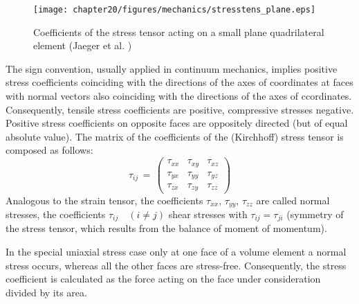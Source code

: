
\begin{figure}[htb!]
\begin{center}
\footnotesize
\texttt{[image: chapter20/figures/mechanics/stresstens\_plane.eps]}
\caption{Coefficients of the stress tensor acting on a small plane quadrilateral element (Jaeger et al. \cite{JCZ:2007})}
\label{fig:stresstens_plane}
\end{center}
\end{figure}

The sign convention, usually applied in continuum mechanics, implies positive stress coefficients coinciding with the directions of the axes of coordinates at faces with normal vectors also coinciding with the directions of the axes of ccordinates. Consequently, tensile stress coefficients are positive, compressive stresses negative. Positive stress coefficients on opposite faces are oppositely directed (but of equal absolute value). The matrix of the coefficients of the (Kirchhoff) stress tensor is composed as follows:
\begin{equation}
\tau_{ij}\,=\,
\left(
\begin{array}{ccc}
\tau_{xx} & \tau_{xy} & \tau_{xz} \\
\tau_{yx} & \tau_{yy} & \tau_{yz} \\
\tau_{zx} & \tau_{zy} & \tau_{zz}
\end{array}
\right)
\label{eq:stress_matrix}
\end{equation}
Analogous to the strain tensor, the coefficients $\tau_{xx},\,\tau_{yy},\,\tau_{zz}$ are called normal stresses, the coefficients $\tau_{ij}\quad(i\neq j)$ shear stresses with $\tau_{ij}=\tau_{ji}$ (symmetry of the stress tensor, which results from the balance of moment of momentum).

In the special uniaxial stress case only at one face of a volume element a normal stress occurs, whereas all the other faces are stress-free. Consequently, the stress coefficient is calculated as the force acting on the face under consideration divided by its area.
